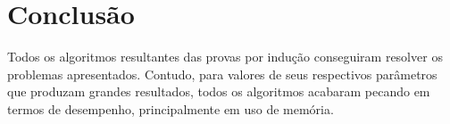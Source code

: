 \documentclass[12pt]{article}
\begin{document}
\section{Conclusão}
\indent Todos os algoritmos resultantes das provas por indução conseguiram resolver os problemas apresentados. Contudo, para valores de seus respectivos parâmetros que produzam grandes resultados, todos os algoritmos acabaram pecando em termos de desempenho, principalmente em uso de memória.\\












\end{document}
